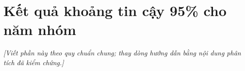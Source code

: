 \section{Kết quả khoảng tin cậy 95\% cho năm nhóm}
\noindent\textit{[Viết phần này theo quy chuẩn chung; thay dòng hướng dẫn bằng nội dung phân tích đã kiểm chứng.]}

